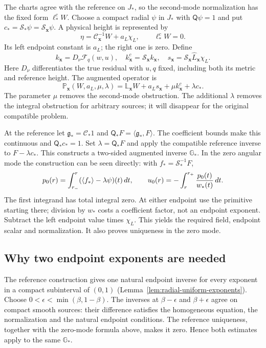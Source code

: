 The charts agree with the reference on $J_*$, so the second-mode
normalization has the fixed form $\ell_*^c W$.
Choose a compact radial $\psi$ in $J_*$ with $\mathsf Q\psi=1$ and
put $c_* =\mathscr S_*\psi=\mathscr S_{\mathbf x}\psi$.
A physical height is represented by
\[
 \eta=\mathscr C_{\mathbf x}^{-1}W+a_L\chi_L,\qquad
 \ell_*^cW=0.
\]
Its left endpoint constant is $a_L$; the right one is zero. Define
\[
 k_{\mathbf x}=D_\nu\mathcal F_q(w,u),\quad
 k_{\mathbf x}^c=\mathscr S_{\mathbf x}k_{\mathbf x},\quad
 s_{\mathbf x}=\mathscr S_{\mathbf x}\widehat L_{\mathbf x}\chi_L.
\]
Here $D_\nu$ differentiates the true residual with $u,q$ fixed,
including both its metric and reference height. The augmented operator is
\begin{equation}\label{eq:vol-abstract-complete-operator}
 \mathbb P_{\mathbf x}(W,a_L,\mu,\lambda)
 =\mathbb L_{\mathbf x}W+a_Ls_{\mathbf x}
                       +\mu k_{\mathbf x}^c+\lambda c_*.
\end{equation}
The parameter $\mu$ removes the second-mode obstruction. The additional
$\lambda$ removes the integral obstruction for arbitrary sources;
it will disappear for the original compatible problem.

At the reference let $\mathfrak g_* =\mathscr C_*1$ and
$\mathsf Q_*F=\langle\mathfrak g_*,F\rangle$.
The coefficient bounds make this continuous and
$\mathsf Q_*c_*=1$. Set $\lambda=\mathsf Q_*F$ and apply the
compatible reference inverse to $F-\lambda c_*$. This constructs a
two-sided augmented inverse $\mathbb G_*$.
In the zero angular mode the construction can be seen directly:
with $f_* =\mathscr S_*^{-1}F$,
\[
 p_0(r)=\int_{r_-}^r(\langle f_*\rangle-\lambda\psi)(t)\,dt,
 \qquad
 u_0(r)=-\int_r^{r_+}\frac{p_0(t)}{w_*(t)}\,dt.
\]
The first integrand has total integral zero. At either endpoint use
the primitive starting there; division by $w_*$ costs a coefficient
factor, not an endpoint exponent. Subtract the left endpoint value
times $\chi_L$. This yields the required field, endpoint scalar and
normalization. It also proves uniqueness in the zero mode.

\subsection{Why two endpoint exponents are needed}

The reference construction gives one natural endpoint inverse for
every exponent in a compact subinterval of $(0,1)$
(Lemma~\ref{lem:radial-uniform-exponents}). Choose
$0<\epsilon<\min(\beta,1-\beta)$.
The inverses at $\beta-\epsilon$ and $\beta+\epsilon$ agree on compact
smooth sources: their difference satisfies the homogeneous equation,
the normalization and the natural endpoint conditions. The reference
uniqueness, together with the zero-mode formula above, makes it zero.
Hence both estimates apply to the same $\mathbb G_*$.


